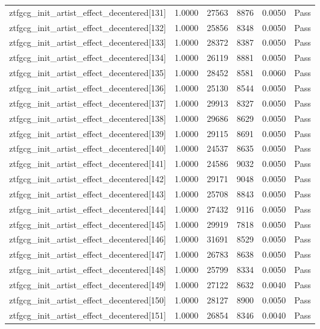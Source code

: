 \begin{table}[htbp]
\begin{tabular}{llrrll}
ztfgcg\_init\_artist\_effect\_decentered[131] & 1.0000 & 27563 & 8876 & 0.0050 & Pass \\
ztfgcg\_init\_artist\_effect\_decentered[132] & 1.0000 & 25856 & 8348 & 0.0050 & Pass \\
ztfgcg\_init\_artist\_effect\_decentered[133] & 1.0000 & 28372 & 8387 & 0.0050 & Pass \\
ztfgcg\_init\_artist\_effect\_decentered[134] & 1.0000 & 26119 & 8881 & 0.0050 & Pass \\
ztfgcg\_init\_artist\_effect\_decentered[135] & 1.0000 & 28452 & 8581 & 0.0060 & Pass \\
ztfgcg\_init\_artist\_effect\_decentered[136] & 1.0000 & 25130 & 8544 & 0.0050 & Pass \\
ztfgcg\_init\_artist\_effect\_decentered[137] & 1.0000 & 29913 & 8327 & 0.0050 & Pass \\
ztfgcg\_init\_artist\_effect\_decentered[138] & 1.0000 & 29686 & 8629 & 0.0050 & Pass \\
ztfgcg\_init\_artist\_effect\_decentered[139] & 1.0000 & 29115 & 8691 & 0.0050 & Pass \\
ztfgcg\_init\_artist\_effect\_decentered[140] & 1.0000 & 24537 & 8635 & 0.0050 & Pass \\
ztfgcg\_init\_artist\_effect\_decentered[141] & 1.0000 & 24586 & 9032 & 0.0050 & Pass \\
ztfgcg\_init\_artist\_effect\_decentered[142] & 1.0000 & 29171 & 9048 & 0.0050 & Pass \\
ztfgcg\_init\_artist\_effect\_decentered[143] & 1.0000 & 25708 & 8843 & 0.0050 & Pass \\
ztfgcg\_init\_artist\_effect\_decentered[144] & 1.0000 & 27432 & 9116 & 0.0050 & Pass \\
ztfgcg\_init\_artist\_effect\_decentered[145] & 1.0000 & 29919 & 7818 & 0.0050 & Pass \\
ztfgcg\_init\_artist\_effect\_decentered[146] & 1.0000 & 31691 & 8529 & 0.0050 & Pass \\
ztfgcg\_init\_artist\_effect\_decentered[147] & 1.0000 & 26783 & 8638 & 0.0050 & Pass \\
ztfgcg\_init\_artist\_effect\_decentered[148] & 1.0000 & 25799 & 8334 & 0.0050 & Pass \\
ztfgcg\_init\_artist\_effect\_decentered[149] & 1.0000 & 27122 & 8632 & 0.0040 & Pass \\
ztfgcg\_init\_artist\_effect\_decentered[150] & 1.0000 & 28127 & 8900 & 0.0050 & Pass \\
ztfgcg\_init\_artist\_effect\_decentered[151] & 1.0000 & 26854 & 8346 & 0.0040 & Pass \\

\end{tabular}
\end{table}
